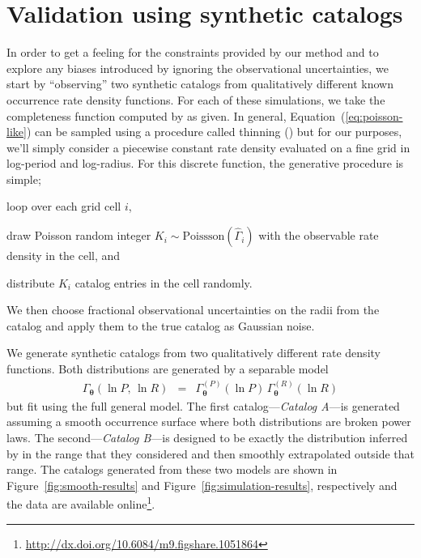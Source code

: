 \documentclass[12pt,preprint]{aastex}
\newcommand{\figref}[1]{\ref{fig:#1}}
\newcommand{\Fig}[1]{Figure~\figref{#1}}
\newcommand{\fig}[1]{\Fig{#1}}
\newcommand{\Eq}[1]{Equation~(\ref{eq:#1})}
\newcommand{\eq}[1]{\Eq{#1}}
\newcommand{\sectlabel}[1]{\label{sect:#1}}
\newcommand{\bvec}[1]{\ensuremath{\boldsymbol{#1}}}
\newcommand{\rate}{\ensuremath{\Gamma}}
\newcommand{\ratepar}{{\ensuremath{\theta}}}
\newcommand{\ratepars}{{\ensuremath{\bvec{\ratepar}}}}
\newcommand{\obs}[1]{\ensuremath{\hat{#1}}}
\newcommand{\radius}{\ensuremath{R}}
\newcommand{\period}{\ensuremath{P}}
\newcommand{\modela}{\emph{Catalog A}}
\newcommand{\modelb}{\emph{Catalog B}}
\begin{document}
\section{Validation using synthetic catalogs}
\sectlabel{valid}

In order to get a feeling for the constraints provided by our method and to
explore any biases introduced by ignoring the observational uncertainties, we
start by ``observing'' two synthetic catalogs from qualitatively different
known occurrence rate density functions.
For each of these simulations, we take the completeness function computed by
\citet{petigura} as given.
In general, \eq{poisson-like} can be sampled using a procedure called thinning
(\citealt{poisson}) but for our purposes, we'll simply consider a piecewise
constant rate density evaluated on a fine grid in log-period and log-radius.
For this discrete function, the generative procedure is simple;
\begin{enumerate}
{\item loop over each grid cell $i$,}
{\item draw Poisson random integer $K_i\sim\mathrm{Poissson}(\obs{\rate}_i)$
with the observable rate density in the cell, and}
{\item distribute $K_i$ catalog entries in the cell randomly.}
\end{enumerate}
We then choose fractional observational uncertainties on the radii from the
\citet{petigura} catalog and apply them to the true catalog as Gaussian noise.

We generate synthetic catalogs from two qualitatively different rate density
functions.
Both distributions are generated by a separable model
\begin{eqnarray}
\rate_\ratepars (\ln\period,\,\ln\radius) &=&
    \rate_\ratepars^{(\period)}(\ln\period)\,
    \rate_\ratepars^{(\radius)}(\ln\radius)
\end{eqnarray}
but fit using the full general model.
The first catalog---\modela---is generated assuming a smooth occurrence
surface where both distributions are broken power laws.
The second---\modelb---is designed to be exactly the distribution inferred by
\citet{petigura} in the range that they considered and then smoothly
extrapolated outside that range.
The catalogs generated from these two models are shown in \fig{smooth-results}
and \fig{simulation-results}, respectively and the data are available
online\footnote{\url{http://dx.doi.org/10.6084/m9.figshare.1051864}}.
\end{document}
